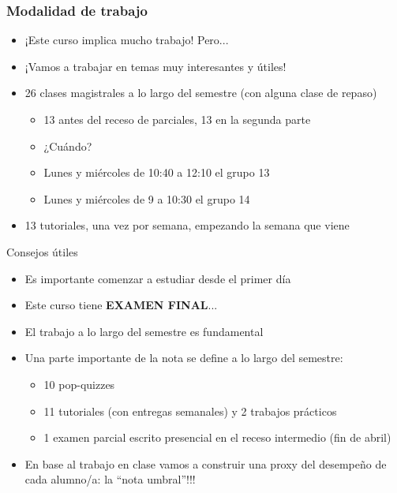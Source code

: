 \documentclass{beamer}
\begin{document}
\begin{frame}
    \frametitle{Modalidad de trabajo}
    \begin{itemize}
        \item ¡Este curso implica mucho trabajo! Pero...
        \item ¡Vamos a trabajar en temas muy interesantes y útiles!
        \item 26 clases magistrales a lo largo del semestre (con alguna clase de repaso)
        \begin{itemize}
            \item 13 antes del receso de parciales, 13 en la segunda parte
            \item ¿Cuándo?
            \item Lunes y miércoles de 10:40 a 12:10 el grupo 13
            \item Lunes y miércoles de 9 a 10:30 el grupo 14
        \end{itemize}
        \item 13 tutoriales, una vez por semana, empezando la semana que viene 
    \end{itemize}
\end{frame}

\begin{frame}{Consejos útiles}
    \begin{itemize}
        \item Es importante comenzar a estudiar desde el primer día
        \item Este curso tiene \textbf{EXAMEN FINAL}...
        \item El trabajo a lo largo del semestre es fundamental
        \item Una parte importante de la nota se define a lo largo del semestre:
            \begin{itemize}
                \item 10 pop-quizzes
                \item 11 tutoriales (con entregas semanales) y 2 trabajos prácticos
                \item 1 examen parcial escrito presencial en el receso intermedio (fin de abril)
            \end{itemize}
        \item En base al trabajo en clase vamos a construir una proxy del desempeño de cada alumno/a: la ``nota umbral''!!!
    \end{itemize}
\end{frame}
\end{document}
